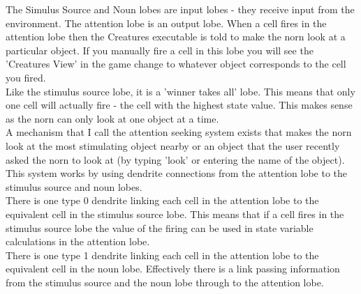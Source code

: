 \documentclass[11pt,twoside,a4paper]{article}
\begin{document}
The Simulus Source and Noun lobes are input lobes - they receive input from the environment. The attention lobe is an output lobe. When a cell fires in the attention lobe then the Creatures executable is told to make the norn look at a particular object. If you manually fire a cell in this lobe you will see the 'Creatures View' in the game change to whatever object corresponds to the cell you fired.~\\

Like the stimulus source lobe, it is a 'winner takes all' lobe. This means that only one cell will actually fire - the cell with the highest state value. This makes sense as the norn can only look at one object at a time.~\\

A mechanism that I call the attention seeking system exists that makes the norn look at the most stimulating object nearby or an object that the user recently asked the norn to look at (by typing 'look' or entering the name of the object). This system works by using dendrite connections from the attention lobe to the stimulus source and noun lobes.~\\

There is one type 0 dendrite linking each cell in the attention lobe to the equivalent cell in the stimulus source lobe. This means that if a cell fires in the stimulus source lobe the value of the firing can be used in state variable calculations in the attention lobe.~\\

There is one type 1 dendrite linking each cell in the attention lobe to the equivalent cell in the noun lobe. Effectively there is a link passing information from the stimulus source and the noun lobe through to the attention lobe.~\\

\end{document}
